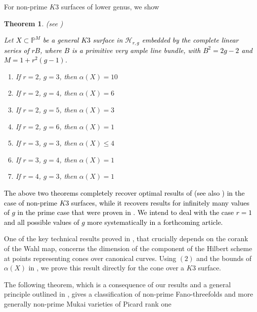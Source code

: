 \documentclass[11pt,twoside]{amsart}
\theoremstyle{plain}
\numberwithin{equation}{section}
\newtheorem{theorem}{Theorem}[section]
\theoremstyle{definition}
\begin{document}

\color{black}


For non-prime $K3$ surfaces of lower genus, we show 

\begin{theorem}(see )\label{ZL for lower genus $K3$ surfaces intro}

Let \textcolor{black}{$X \subset \mathbb{P}^{M}$ be a general $K3$ surface in $\mathcal{H}_{r,g}$ embedded by the complete linear series of $rB$, where $B$ is a primitive very ample line bundle, with $B^2 = 2g-2$ and $M = 1+r^2(g-1)$.}

    \begin{enumerate}
        \item If $r = 2$, $g = 3$, then $\alpha(X) = 10$ 
        \item If $r = 2$, $g = 4$, then $\alpha(X) = 6$ 
        \item If $r = 2$, $g = 5$, then $\alpha(X) = 3$ 
        \item If $r = 2$, $g = 6$, then $\alpha(X) = 1$ 
        \item If $r = 3$, $g = 3$, then $\alpha(X) \leq 4$
        \item If $r = 3$, $g = 4$, then $\alpha(X) = 1$ 
        \item If $r = 4$, $g = 3$, then $\alpha(X) = 1$
        
       
        
    \end{enumerate}
    
\end{theorem}

\textcolor{black}{The above two theorems completely recover optimal results of \cite{CLM98} (see also \cite{CLM98c}) in the case of non-prime $K3$ surfaces, while it recovers results for infinitely many values of $g$ in the prime case that were proven in \cite{CLM93}. We intend to deal with the case $r = 1$ and all possible values of $g$ more systematically in a forthcoming article. }

One of the key technical results proved in \cite{CLM98}, that crucially depends on the corank of the Wahl map, concerns the dimension of the component of the Hilbert scheme at points representing cones over canonical curves. Using  $(2)$ and the bounds of $\alpha(X)$ in , we prove this result directly for the cone over a $K3$ surface. \par
The following theorem, which is a consequence of our results and a general principle outlined in \cite{CLM98}, gives a classification of non-prime Fano-threefolds and more generally non-prime Mukai varieties of Picard rank one 
 
\end{document}
